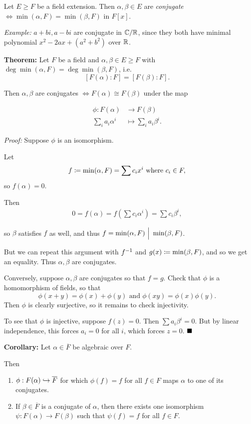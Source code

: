 Let \(E \geq F\) be a field extension. Then \(\alpha,\beta \in E\) are
\emph{conjugate} \(\iff \min(\alpha, F) = \min(\beta, F)\) in \(F[x]\).

\emph{Example:} \(a + bi, a-bi\) are conjugate in \({\mathbb{C}}/{\mathbb{R}}\), since
they both have minimal polynomial \(x^2 - 2ax + (a^2 + b^2)\) over
\({\mathbb{R}}\).

\textbf{Theorem:} Let \(F\) be a field and
\(\alpha, \beta \in E \geq F\) with
\(\deg \min (\alpha, F) = \deg \min(\beta, F)\), i.e. \[
[F(\alpha): F] = [F(\beta): F]
.\]

Then \(\alpha, \beta\) are conjugates \(\iff F(\alpha) \cong F(\beta)\)
under the map

\begin{align*}
\phi: F(\alpha) &\to F(\beta)\\
\sum_i a_i \alpha^i &\mapsto \sum_i a_i \beta^i
.\end{align*}

\emph{Proof:} Suppose \(\phi\) is an isomorphism.

Let \[
f \coloneqq \min (\alpha, F) = \sum c_i x^i
\text{ where }
c_i \in F
,\] so \(f(\alpha) = 0\).

Then \begin{align*}
0 = f(\alpha) = f(\sum c_i \alpha^i) = \sum c_i \beta^i
,\end{align*}

so \(\beta\) satisfies \(f\) as well, and thus
\(f = \min(\alpha, F) {~\Bigm| ~} \min(\beta, F)\).

But we can repeat this argument with \(f^{-1}\) and
\(g(x) \coloneqq \min(\beta, F)\), and so we get an equality. Thus
\(\alpha, \beta\) are conjugates.

Conversely, suppose \(\alpha, \beta\) are conjugates so that \(f = g\).
Check that \(\phi\) is a homomorphism of fields, so that \[
\phi(x + y) = \phi(x) + \phi(y)
\text{ and }
\phi(xy) = \phi(x) \phi(y)
.\] Then \(\phi\) is clearly surjective, so it remains to check
injectivity.

To see that \(\phi\) is injective, suppose \(f(z) = 0\). Then
\(\sum a_i \beta^i = 0\). But by linear independence, this forces
\(a_i = 0\) for all \(i\), which forces \(z=0\). \(\qed\)

\textbf{Corollary:} Let \(\alpha \in \overline F\) be algebraic over
\(F\).

Then

\begin{enumerate}
\def\labelenumi{\arabic{enumi}.}
\item
  \(\phi: F(\alpha) \hookrightarrow \overline F\) for which \(\phi(f) = f\) for
  all \(f\in F\) maps \(\alpha\) to one of its conjugates.
\item
  If \(\beta \in \overline F\) is a conjugate of \(\alpha\), then there
  exists one isomorphism \(\psi: F(\alpha) \to F(\beta)\) such that
  \(\psi(f) = f\) for all \(f\in F\).
\end{enumerate}

